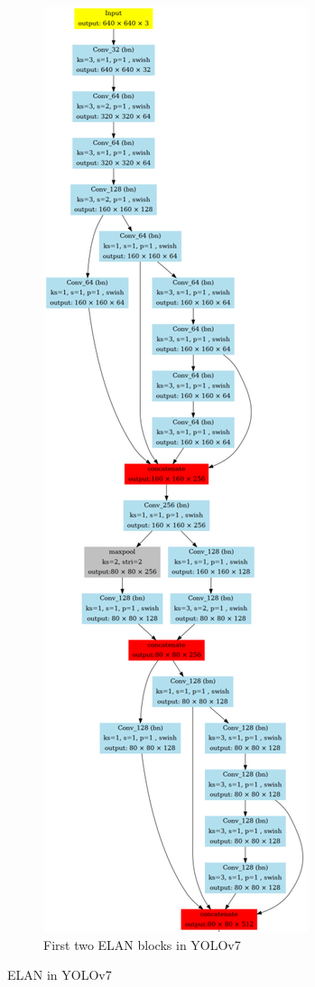 \begin{figure}[p]
\begin{subfigure}[b]{.5\textwidth}
        \includegraphics[width=.8\linewidth]{figures/yolo-elan-blocks-90.png}
        \caption{First two ELAN blocks in YOLOv7}
        \label{fig:elan-yolo}
    \end{subfigure}
    \caption{ELAN in YOLOv7}
    \label{fig:elan}
  \end{figure}

